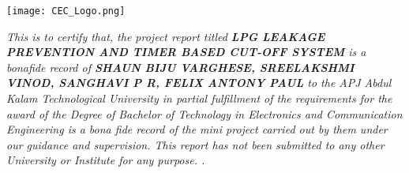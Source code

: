 \documentclass[a4paper,12pt]{report}
\begin{document}
	\begin{center}
		\texttt{[image: CEC\_Logo.png]}	

	\end{center}
\begin{spacing}
\textit{This is to certify that, the project report titled  \textbf{LPG LEAKAGE PREVENTION AND TIMER BASED CUT-OFF SYSTEM} is a bonafide record of  %
\textbf{SHAUN BIJU VARGHESE, SREELAKSHMI VINOD, SANGHAVI P R, FELIX ANTONY PAUL} 
to the APJ Abdul Kalam Technological University in
partial fulfillment of the requirements for the award of the Degree of Bachelor of Technology in
Electronics and Communication Engineering is a bona fide record of the mini project carried out by
them under our guidance and supervision. This report has not been submitted to any other University
or Institute for any purpose. 
\textbf{}.}
\end{spacing}
	
\end{document}
